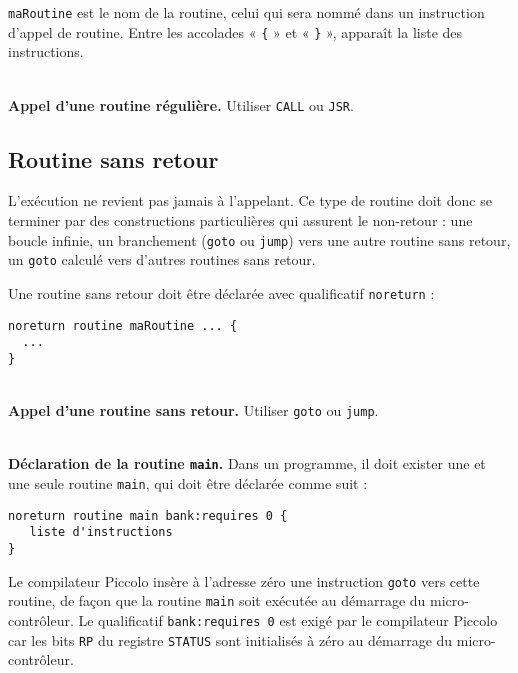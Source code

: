 \texttt{maRoutine} est le nom de la routine, celui qui sera nommé dans un instruction d’appel de routine. Entre les accolades « \texttt{\{} » et « \texttt{\}} », apparaît la liste des instructions.

~\\
\textbf{Appel d’une routine régulière.} Utiliser \texttt{CALL} ou \texttt{JSR}.

\subsection{Routine sans retour}

L’exécution ne revient pas jamais à l’appelant. Ce type de routine doit donc se terminer par des constructions particulières qui assurent le non-retour : une boucle infinie, un branchement (\texttt{goto} ou \texttt{jump}) vers une autre routine sans retour, un \texttt{goto} calculé vers d’autres routines sans retour.

Une routine sans retour doit être déclarée avec qualificatif \texttt{noreturn} :
\begin{lstlisting}[language=piccolo]
noreturn routine maRoutine ... {
  ...
}
\end{lstlisting}

~\\
\textbf{Appel d’une routine sans retour.} Utiliser \texttt{goto} ou \texttt{jump}.


~\\
\textbf{Déclaration de la routine \texttt{main}.} Dans un programme, il doit exister une et une seule routine \texttt{main}, qui doit être déclarée comme suit :

\begin{lstlisting}[language=piccolo]
noreturn routine main bank:requires 0 {
   liste d'instructions
}

\end{lstlisting}

Le compilateur Piccolo insère à l’adresse zéro une instruction \texttt{goto} vers cette routine, de façon que la routine \texttt{main} soit exécutée au démarrage du micro-contrôleur. Le qualificatif \texttt{bank:requires 0} est exigé par le compilateur Piccolo car les bits \texttt{RP} du registre \texttt{STATUS} sont initialisés à zéro au démarrage du micro-contrôleur.


